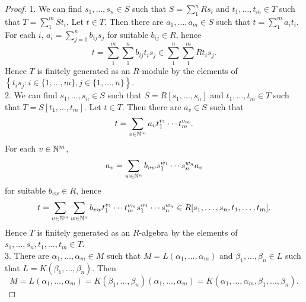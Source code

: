 \begin{proof}
    1. We can find $s_1,\dots,s_n\in S$ such that $S = \sum_1^n Rs_i$ and $t_1,\dots,t_m\in T$ such that $T=\sum_1^m St_i$. Let $t \in T$. Then there are $a_1,\dots,a_m\in S$ such that 
    $t = \sum_1^m a_it_i$.
    For each $i$, $a_i = \sum_{j=1}^n b_{ij}s_j$ for suitable $b_{ij}\in R$, hence 
    $$t=\sum_1^m \sum_1^n b_{ij}t_is_j\in \sum_1^n \sum_1^m Rt_is_j.$$
    Hence $T$ is finitely generated as an $R$-module by the elements of $\left\{t_is_j : i\in\{1,\dots,m\},j\in\{1,\dots,n\}\right\}$.\\
    2. We can find $s_1,\dots,s_n\in S$ such that $S = R[s_1,\dots,s_n]$ and $t_1,\dots,t_m\in T$ such that $T=S[t_1,\dots,t_m]$. Let $t \in T$.  Then there are $a_v\in S$ such that 
    $$t = \sum_{v\in \mathbb{N}^m} a_vt_1^{v_1}\cdots  t_m^{v_m}.$$
    For each $v\in \mathbb{N}^m$, $$a_v = \sum_{w\in \mathbb{N}^n} b_{vw}s_1^{w_1}\cdots s_n^{w_n}a_v $$ for suitable $b_{vw}\in R$, hence 
   $$t=\sum_{v\in \mathbb{N}^m} \sum_{w\in \mathbb{N}^n} b_{vw}t_1^{v_1}\cdots t_m^{v_m}s_1^{w_1}\cdots s_n^{w_n}\in R[s_1,\dots,s_n,t_1,\dots,t_m].$$
    Hence $T$ is finitely generated as an $R$-algebra by the elements of $s_1,\dots,s_n,t_1,\dots,t_m\in T$.\\
    3. There are $\alpha_1,\dots,\alpha_m\in M$ such that $M=L(\alpha_1,\dots,\alpha_m)$ and $\beta_1,\dots,\beta_n\in L$ such that $L= K(\beta_1,\dots,\beta_n)$. Then 
    $$M=L(\alpha_1,\dots,\alpha_m)=K(\beta_1,\dots,\beta_n)(\alpha_1,\dots,\alpha_m) = K(\alpha_1,\dots,\alpha_m,\beta_1,\dots,\beta_n).$$
\end{proof}

